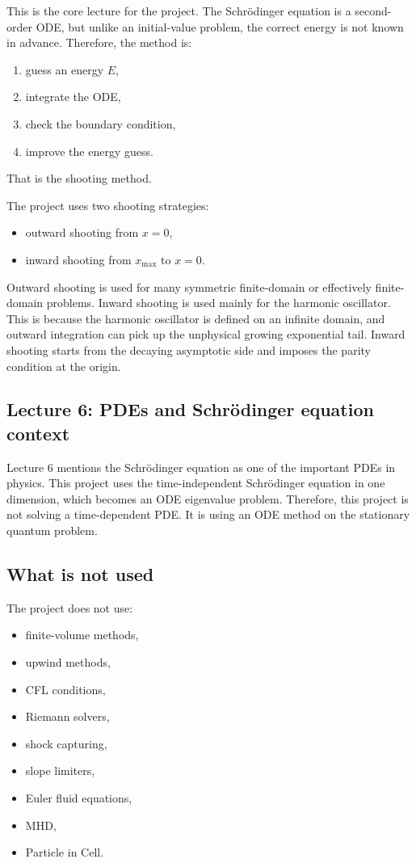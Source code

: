 \documentclass[11pt]{article}
\begin{document}
    This is the core lecture for the project. The Schr\"odinger equation is a second-order ODE, but unlike an initial-value problem, the correct energy is not known in advance. Therefore, the method is:
    \begin{enumerate}
        \item guess an energy $E$,
        \item integrate the ODE,
        \item check the boundary condition,
        \item improve the energy guess.
    \end{enumerate}

    That is the shooting method.

    The project uses two shooting strategies:
    \begin{itemize}
        \item outward shooting from $x=0$,
        \item inward shooting from $x_{\max}$ to $x=0$.
    \end{itemize}

    Outward shooting is used for many symmetric finite-domain or effectively finite-domain problems. Inward shooting is used mainly for the harmonic oscillator. This is because the harmonic oscillator is defined on an infinite domain, and outward integration can pick up the unphysical growing exponential tail. Inward shooting starts from the decaying asymptotic side and imposes the parity condition at the origin.

    \subsection{Lecture 6: PDEs and Schr\"odinger equation context}

    Lecture 6 mentions the Schr\"odinger equation as one of the important PDEs in physics. This project uses the time-independent Schr\"odinger equation in one dimension, which becomes an ODE eigenvalue problem. Therefore, this project is not solving a time-dependent PDE. It is using an ODE method on the stationary quantum problem.

    \subsection{What is not used}

    The project does not use:
    \begin{itemize}
        \item finite-volume methods,
        \item upwind methods,
        \item CFL conditions,
        \item Riemann solvers,
        \item shock capturing,
        \item slope limiters,
        \item Euler fluid equations,
        \item MHD,
        \item Particle in Cell.
    \end{itemize}
\end{document}
